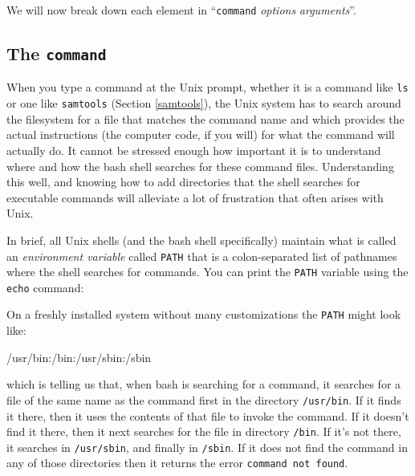 \documentclass[]{krantz}
\makeatletter
\newenvironment{Shaded}{\begin{snugshade}}{\end{snugshade}}
\newcommand{\BuiltInTok}[1]{#1}
\newcommand{\ExtensionTok}[1]{#1}
\newcommand{\NormalTok}[1]{#1}
\newcommand{\VariableTok}[1]{\textcolor[rgb]{0,0,0}{#1}}
\newenvironment{kframe}{%
\medskip{}
\setlength{\fboxsep}{.8em}
 \def\at@end@of@kframe{}%
 \ifinner\ifhmode%
  \def\at@end@of@kframe{\end{minipage}}%
  \begin{minipage}{\columnwidth}%
 \fi\fi%
 \def\FrameCommand##1{\hskip\@totalleftmargin \hskip-\fboxsep
 \colorbox{shadecolor}{##1}\hskip-\fboxsep
     \hskip-\linewidth \hskip-\@totalleftmargin \hskip\columnwidth}%
 \MakeFramed {\advance\hsize-\width
   \@totalleftmargin\z@ \linewidth\hsize
   \@setminipage}}%
 {\par\unskip\endMakeFramed%
 \at@end@of@kframe}
\renewenvironment{Shaded}{\begin{kframe}}{\end{kframe}}
\makeatother
\begin{document}
We will now break down each element in ``\texttt{command} \emph{options} \emph{arguments}''.

\hypertarget{anatomy-command}{%
\subsection{\texorpdfstring{The \texttt{command}}{The command}}\label{anatomy-command}}

When you type a command at the Unix prompt, whether it is a command like \texttt{ls} or
one like \texttt{samtools} (Section \ref{samtools}), the Unix system has to search around
the filesystem for a file that matches the command name and which provides the actual
instructions (the computer code, if you will) for what the command will actually do.
It cannot be stressed enough how important it is to
understand where and how the bash shell searches for these command files. Understanding this
well, and knowing how to add directories that the shell searches for executable
commands will alleviate a lot of frustration that often arises with Unix.

In brief, all Unix shells (and the bash shell specifically) maintain what is called
an \emph{environment variable} called \texttt{PATH} that is a colon-separated list of pathnames
where the shell searches for commands. You can print the \texttt{PATH} variable using
the \texttt{echo} command:

\begin{Shaded}
\end{Shaded}

On a freshly installed system without many customizations the \texttt{PATH} might look like:

\begin{Shaded}
\begin{Highlighting}[]
\ExtensionTok{/usr}\NormalTok{/bin:/bin:}\ExtensionTok{/usr}\NormalTok{/sbin:}\ExtensionTok{/sbin}
\end{Highlighting}
\end{Shaded}

which is telling us that, when bash is searching for a command, it searches for a file
of the same name as the command first in the directory \texttt{/usr/bin}. If it finds it there, then
it uses the contents of that file to invoke the command. If it doesn't find it there,
then it next searches for the file in directory \texttt{/bin}. If it's not there, it searches
in \texttt{/usr/sbin}, and finally in \texttt{/sbin}. If it does not find the command in any of those directories
then it returns the error \texttt{command\ not\ found}.
\end{document}
